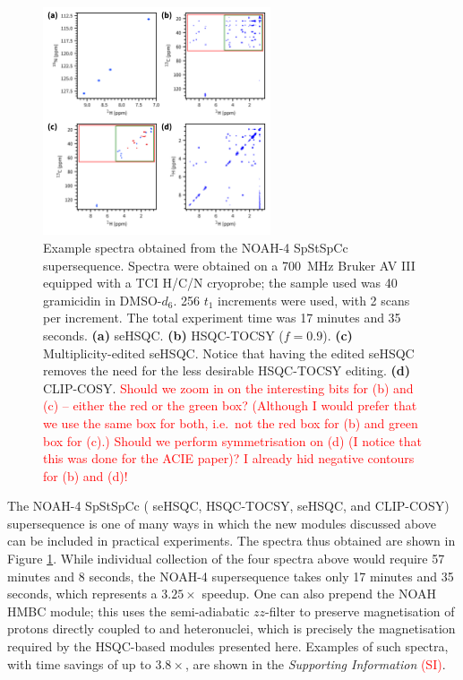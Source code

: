 \documentclass[11pt]{article}
\newcommand*{\carbon}{\ce{^{13}C}}
\newcommand*{\nitrogen}{\ce{^{15}N}}
\newcommand*{\red}[1]{\textcolor{red}{#1}}
\newcommand*{\figref}[1]{Figure \ref{fig:#1}}
\newcommand*{\SInf}{\textit{Supporting Information}}
\newcommand*{\sitodo}{\red{(SI)}}
\begin{document}
\begin{figure}[H]
    \centering
    \includegraphics[width=0.6\textwidth]{figures/spstspcc.png}
    \caption{
        Example spectra obtained from the NOAH-4 SpStSpCc supersequence.
        Spectra were obtained on a \SI{700}{\MHz} Bruker AV III equipped with a TCI H/C/N cryoprobe; the sample used was \SI{40}{\milli\molar} gramicidin in DMSO-$d_6$.
        256 $t_1$ increments were used, with 2 scans per increment.
        The total experiment time was 17 minutes and 35 seconds.
        \textbf{(a)} \nitrogen{} seHSQC.
        \textbf{(b)} \carbon{} HSQC-TOCSY ($f = 0.9$).
        \textbf{(c)} Multiplicity-edited \carbon{} seHSQC. Notice that having the edited seHSQC removes the need for the less desirable HSQC-TOCSY editing.
        \textbf{(d)} CLIP-COSY.
        \red{Should we zoom in on the interesting bits for (b) and (c) -- either the red or the green box? (Although I would prefer that we use the same box for both, i.e.\ not the red box for (b) and green box for (c).) Should we perform symmetrisation on (d) (I notice that this was done for the ACIE paper)? I already hid negative contours for (b) and (d)!}
    }
    \label{fig:example_spec}
\end{figure}

The NOAH-4 SpStSpCc (\nitrogen{} seHSQC, \carbon{} HSQC-TOCSY, \carbon{} seHSQC, and CLIP-COSY) supersequence is one of many ways in which the new modules discussed above can be included in practical experiments.
The spectra thus obtained are shown in \figref{example_spec}.
While individual collection of the four spectra above would require 57 minutes and 8 seconds, the NOAH-4 supersequence takes only 17 minutes and 35 seconds, which represents a $3.25\times$ speedup.
One can also prepend the NOAH HMBC module;\autocite{Kupce2019JMR} this uses the semi-adiabatic $zz$-filter to preserve magnetisation of protons directly coupled to \carbon{} and \nitrogen{} heteronuclei, which is precisely the magnetisation required by the HSQC-based modules presented here.
Examples of such spectra, with time savings of up to $3.8\times$, are shown in the \SInf{} \sitodo{}.
\end{document}
